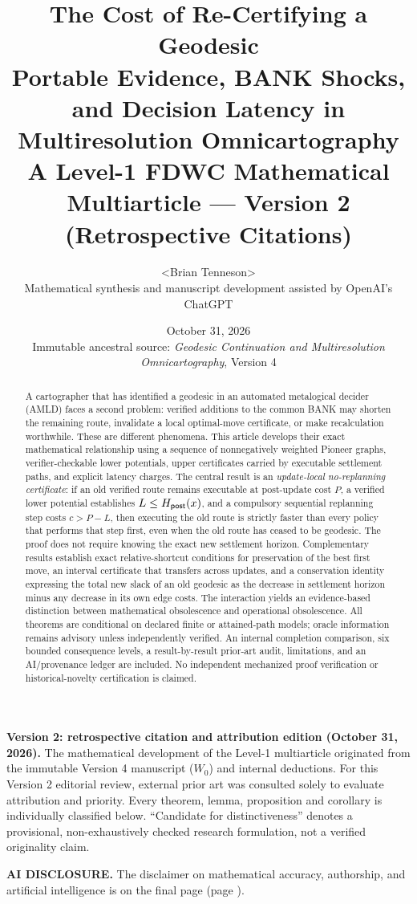 \documentclass[11pt]{article}
\title{\textbf{The Cost of Re-Certifying a Geodesic}\\[3pt]\large Portable Evidence, BANK Shocks, and Decision Latency in Multiresolution Omnicartography\\[7pt]\normalsize A Level-1 FDWC Mathematical Multiarticle --- Version 2 (Retrospective Citations)}
\author{\textless{}Brian Tenneson\textgreater{}\\\small Mathematical synthesis and manuscript development assisted by OpenAI's ChatGPT}
\date{October 31, 2026\\\small Immutable ancestral source: \emph{Geodesic Continuation and Multiresolution Omnicartography}, Version 4}
\theoremstyle{definition}\newtheorem{definition}[theorem]{Definition}\newtheorem{assumption}[theorem]{Assumption}
\theoremstyle{remark}\newtheorem{remark}[theorem]{Remark}
\begin{document}
\maketitle
\begin{center}\small\textbf{Version 2: retrospective citation and attribution edition (October 31, 2026).} The mathematical development of the Level-1 multiarticle originated from the immutable Version 4 manuscript ($W_0$) and internal deductions. For this Version 2 editorial review, external prior art was consulted solely to evaluate attribution and priority. Every theorem, lemma, proposition and corollary is individually classified below. ``Candidate for distinctiveness'' denotes a provisional, non-exhaustively checked research formulation, not a verified originality claim.\end{center}
\medskip
\noindent\textbf{AI DISCLOSURE.} The disclaimer on mathematical accuracy, authorship, and artificial intelligence is on the final page (page \pageref{sec:disclaimer}).
\begin{abstract}
A cartographer that has identified a geodesic in an automated metalogical decider (AMLD) faces a second problem: verified additions to the common BANK may shorten the remaining route, invalidate a local optimal-move certificate, or make recalculation worthwhile. These are different phenomena. This article develops their exact mathematical relationship using a sequence of nonnegatively weighted Pioneer graphs, verifier-checkable lower potentials, upper certificates carried by executable settlement paths, and explicit latency charges. The central result is an \emph{update-local no-replanning certificate}: if an old verified route remains executable at post-update cost $P$, a verified lower potential establishes $L\leq H_{\mathsf{post}}(x)$, and a compulsory sequential replanning step costs $c>P-L$, then executing the old route is strictly faster than every policy that performs that step first, even when the old route has ceased to be geodesic. The proof does not require knowing the exact new settlement horizon. Complementary results establish exact relative-shortcut conditions for preservation of the best first move, an interval certificate that transfers across updates, and a conservation identity expressing the total new slack of an old geodesic as the decrease in settlement horizon minus any decrease in its own edge costs. The interaction yields an evidence-based distinction between mathematical obsolescence and operational obsolescence. All theorems are conditional on declared finite or attained-path models; oracle information remains advisory unless independently verified. An internal completion comparison, six bounded consequence levels, a result-by-result prior-art audit, limitations, and an AI/provenance ledger are included. No independent mechanized proof verification or historical-novelty certification is claimed.
\end{abstract}
\tableofcontents
\newpage
\end{document}
